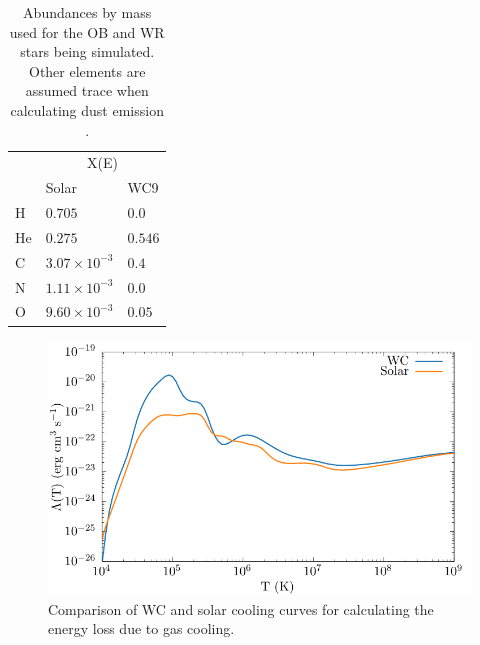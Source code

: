\begin{table}
  \centering
  \begin{tabular}{@{}lll@{}}
  \toprule
  \multicolumn{1}{l}{} & \multicolumn{2}{c}{X(E)} \\ \cmidrule(l){2-3} 
   & Solar & WC9 \\ \midrule
  H & $0.705$ & $0.0$ \\
  He & $0.275$ & $0.546$ \\
  C & $3.07 \times 10^{-3}$ & $0.4$ \\
  N & $1.11 \times 10^{-3}$ & $0.0$ \\
  O & $9.60 \times 10^{-3}$ & $0.05$ \\
  \hline
  \end{tabular}
  \caption[Abundances by mass used for OB and WR stars]{Abundances by mass used for the OB and WR stars being simulated. Other elements are assumed trace when calculating dust emission \parencite{williamsSpectraWC9Stars2015}.}
  \label{tab:abundances}
\end{table}


\begin{figure}
  \centering
  \includegraphics{assets/cooling-curve/cooling-curve-no-elements.pdf}
  \caption[WR and OB $\Lambda(T)$ cooling curves]{Comparison of WC and solar cooling curves for calculating the energy loss due to gas cooling.}
  \label{fig:cooling-curve}
\end{figure}


